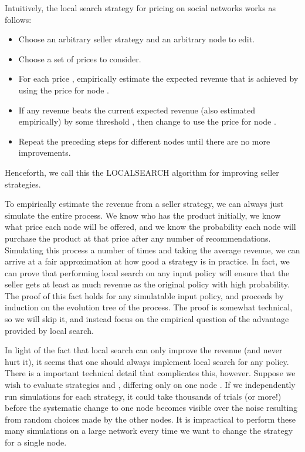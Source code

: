 \documentclass[letterpaper,twoside]{article}
\newcommand{\LS}{\textrm{L{\scriptsize OCAL}\-S{\scriptsize EARCH}}}
\begin{document}
Intuitively, the local search strategy for pricing on social networks works as follows:
\begin{itemize}
    \item Choose an arbitrary seller strategy  and an arbitrary node  to edit.
    \item Choose a set of prices  to consider.
    \item For each price , empirically estimate the expected revenue  that is
       achieved by using the price  for node .
    \item If any revenue  beats the current expected revenue (also estimated
       empirically) by some threshold , then change  to use the price 
       for node .
    \item Repeat the preceding steps for different nodes until there are no more improvements.
\end{itemize}
Henceforth, we call this the \LS{} algorithm for improving seller strategies.

To empirically estimate the revenue from a seller strategy, we can always
just simulate the entire process. We know who has the product initially, we
know what price each node will be offered, and we know the probability each
node will purchase the product at that price after any number of
recommendations. Simulating this process a number of times and taking the
average revenue, we can arrive at a fair approximation at how good a strategy
is in practice. In fact, we can prove that performing local search on any
input policy will ensure that the seller gets at least as much revenue as the
original policy with high probability. The proof of this fact holds for any
simulatable input policy, and proceeds by induction on the evolution tree of
the process. The proof is somewhat technical, so we will skip it, and instead
focus on the empirical question of the advantage provided by local search.

In light of the fact that local search can only improve the revenue (and never
hurt it), it seems that one should always implement local search for any
policy.  There is a important technical detail that complicates this,
however. Suppose we wish to evaluate strategies  and , differing
only on one node . If we independently run simulations for each strategy,
it could take thousands of trials (or more!) before the systematic change to
one node becomes visible over the noise resulting from random choices made by
the other nodes. It is impractical to perform these many simulations on a
large network every time we want to change the strategy for a single node.
\end{document}

